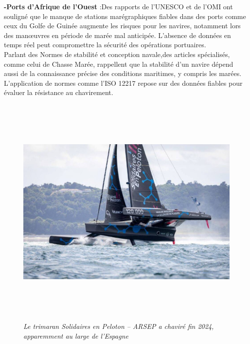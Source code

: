 \documentclass[a4paper,12pt,openany]{report}
\begin{document}
\textbf{-Ports d’Afrique de l’Ouest }:Des rapports de l’UNESCO et de l’OMI ont souligné que le manque de stations marégraphiques fiables dans des ports comme ceux du Golfe de Guinée augmente les risques pour les navires, notamment lors des manœuvres en période de marée mal anticipée. L’absence de données en temps réel peut compromettre la sécurité des opérations portuaires.\\
\quad Parlant des Normes de stabilité et conception navale,des articles spécialisés, comme celui de Chasse Marée, rappellent que la stabilité d’un navire dépend aussi de la connaissance précise des conditions maritimes, y compris les marées. L’application de normes comme l’ISO 12217 repose sur des données fiables pour évaluer la résistance au chavirement.\\

  
\begin{figure}[H]
	\begin{center}
	           \begin{minipage}{\textwidth}
			    \begin{center}
			    \includegraphics[width=1\textwidth,height=4.6in]{images/trimaran.png}
			    \end{center}
			    \end{minipage}
			\caption{\emph{Le trimaran Solidaires en Peloton – ARSEP a chaviré fin 2024, apparemment au large de l'Espagne\cite{Bianchi2017}\label{Fig 1.2} }} 
	\end{center}
\end{figure}
\end{document}
